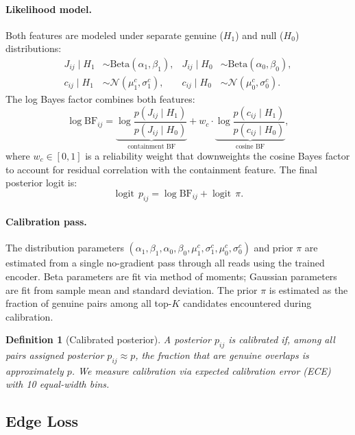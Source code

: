 \documentclass[11pt,a4paper]{article}
\newcommand{\BF}{\mathrm{BF}}
\DeclareMathOperator{\logit}{logit}
\newtheorem{definition}{Definition}
\begin{document}
\paragraph{Likelihood model.}
Both features are modeled under separate genuine ($H_1$) and null
($H_0$) distributions:
\begin{align}
  J_{ij} \mid H_1 &\sim \mathrm{Beta}(\alpha_1, \beta_1), &
  J_{ij} \mid H_0 &\sim \mathrm{Beta}(\alpha_0, \beta_0), \\
  c_{ij} \mid H_1 &\sim \mathcal{N}(\mu_1^c, \sigma_1^c), &
  c_{ij} \mid H_0 &\sim \mathcal{N}(\mu_0^c, \sigma_0^c).
\end{align}
The log Bayes factor combines both features:
\begin{equation}
  \label{eq:log-bf}
  \log \BF_{ij}
    = \underbrace{\log \frac{p(J_{ij} \mid H_1)}{p(J_{ij} \mid H_0)}}_{\text{containment BF}}
    + w_c \cdot \underbrace{\log \frac{p(c_{ij} \mid H_1)}{p(c_{ij} \mid H_0)}}_{\text{cosine BF}},
\end{equation}
where $w_c \in [0,1]$ is a reliability weight that downweights the
cosine Bayes factor to account for residual correlation with the
containment feature.  The final posterior logit is:
\begin{equation}
  \logit\, p_{ij} = \log \BF_{ij} + \logit\, \pi.
\end{equation}

\paragraph{Calibration pass.}
The distribution parameters $(\alpha_1, \beta_1, \alpha_0, \beta_0,
\mu_1^c, \sigma_1^c, \mu_0^c, \sigma_0^c)$ and prior $\pi$ are
estimated from a single no-gradient pass through all reads using the
trained encoder.  Beta parameters are fit via method of moments;
Gaussian parameters are fit from sample mean and standard deviation.
The prior $\pi$ is estimated as the fraction of genuine pairs among
all top-$K$ candidates encountered during calibration.

\begin{definition}[Calibrated posterior]
  A posterior $p_{ij}$ is \emph{calibrated} if, among all pairs
  assigned posterior $p_{ij} \approx p$, the fraction that are genuine
  overlaps is approximately $p$.  We measure calibration via expected
  calibration error (ECE) with 10 equal-width bins.
\end{definition}

\subsection{Edge Loss}
\label{sec:loss}
\end{document}
